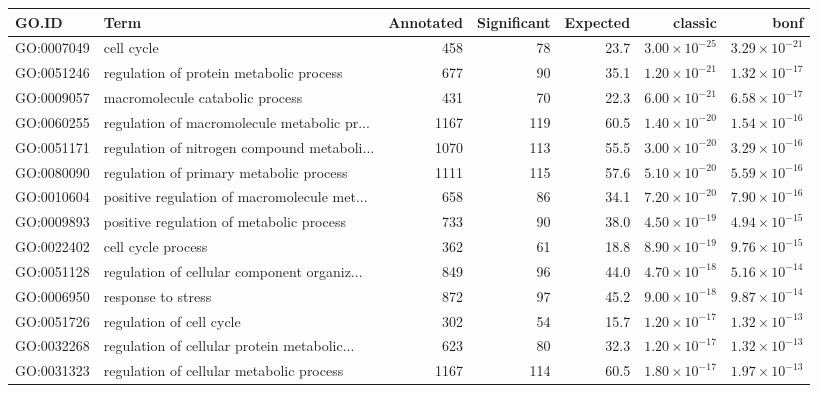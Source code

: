 \begin{table}[ht]
\centering
\begin{adjustbox}{max width=\textwidth}
\begin{tabular}{llrrrrr}
  \hline
GO.ID & Term & Annotated & Significant & Expected & classic & bonf \\ 
  \hline
GO:0007049 & cell cycle & 458 & 78 & 23.7 & $3.00 \times 10^{-25}$ & $3.29 \times 10^{-21}$ \\ 
  GO:0051246 & regulation of protein metabolic process & 677 & 90 & 35.1 & $1.20 \times 10^{-21}$ & $1.32 \times 10^{-17}$ \\ 
  GO:0009057 & macromolecule catabolic process & 431 & 70 & 22.3 & $6.00 \times 10^{-21}$ & $6.58 \times 10^{-17}$ \\ 
  GO:0060255 & regulation of macromolecule metabolic pr... & 1167 & 119 & 60.5 & $1.40 \times 10^{-20}$ & $1.54 \times 10^{-16}$ \\ 
  GO:0051171 & regulation of nitrogen compound metaboli... & 1070 & 113 & 55.5 & $3.00 \times 10^{-20}$ & $3.29 \times 10^{-16}$ \\ 
  GO:0080090 & regulation of primary metabolic process & 1111 & 115 & 57.6 & $5.10 \times 10^{-20}$ & $5.59 \times 10^{-16}$ \\ 
  GO:0010604 & positive regulation of macromolecule met... & 658 & 86 & 34.1 & $7.20 \times 10^{-20}$ & $7.90 \times 10^{-16}$ \\ 
  GO:0009893 & positive regulation of metabolic process & 733 & 90 & 38.0 & $4.50 \times 10^{-19}$ & $4.94 \times 10^{-15}$ \\ 
  GO:0022402 & cell cycle process & 362 & 61 & 18.8 & $8.90 \times 10^{-19}$ & $9.76 \times 10^{-15}$ \\ 
  GO:0051128 & regulation of cellular component organiz... & 849 & 96 & 44.0 & $4.70 \times 10^{-18}$ & $5.16 \times 10^{-14}$ \\ 
  GO:0006950 & response to stress & 872 & 97 & 45.2 & $9.00 \times 10^{-18}$ & $9.87 \times 10^{-14}$ \\ 
  GO:0051726 & regulation of cell cycle & 302 & 54 & 15.7 & $1.20 \times 10^{-17}$ & $1.32 \times 10^{-13}$ \\ 
  GO:0032268 & regulation of cellular protein metabolic... & 623 & 80 & 32.3 & $1.20 \times 10^{-17}$ & $1.32 \times 10^{-13}$ \\ 
  GO:0031323 & regulation of cellular metabolic process & 1167 & 114 & 60.5 & $1.80 \times 10^{-17}$ & $1.97 \times 10^{-13}$ \\ 

\end{tabular}
\end{adjustbox}
\end{table}
